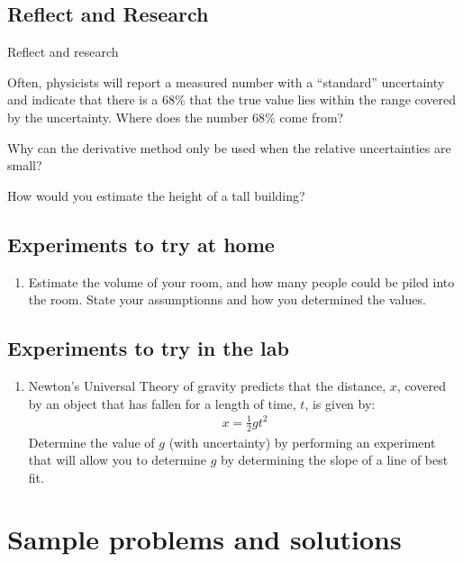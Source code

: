 \subsection{Reflect and Research}
\vspace{0.5cm}
\begin{chapteractivity}{Reflect and research}
{
\item Often, physicists will report a measured number with a ``standard'' uncertainty and indicate that there is a 68\% that the true value lies within the range covered by the uncertainty. Where does the number 68\% come from?
\item Why can the derivative method only be used when the relative uncertainties are small?
\item How would you estimate the height of a tall building?
}
\end{chapteractivity}
\subsection{Experiments to try at home}
\begin{enumerate}
\item Estimate the volume of your room, and how many people could be piled into the room. State your assumptionns and how you determined the values.
\end{enumerate}
\subsection{Experiments to try in the lab}
\begin{enumerate}
\item Newton's Universal Theory of gravity predicts that the distance, $x$, covered by an object that has fallen for a length of time, $t$, is given by:
\begin{align*}
x = \frac{1}{2}gt^2
\end{align*}
Determine the value of $g$ (with uncertainty) by performing an experiment that will allow you to determine $g$ by determining the slope of a line of best fit.
\end{enumerate}


\section{Sample problems and solutions}
